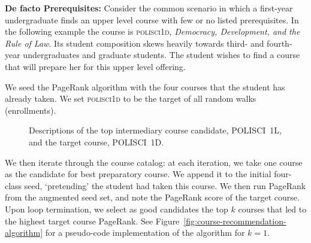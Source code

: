 {\bf De facto Prerequisites:} Consider the common scenario in
which a first-year undergraduate finds an upper
level course with few or no listed prerequisites. In the following
example the course is \textsc{polisci1d}, {\em Democracy, Development, and
  the Rule of Law}. Its student composition skews heavily towards
third- and fourth- year undergraduates and graduate students. The
student wishes to find a course that will prepare her for this upper
level offering.

We seed the PageRank algorithm with the four courses that the student
has already taken. We set \textsc{polisci1d} to be the target of all random
walks (enrollments).

\begin{figure}
    \centering
    \noindent{}
    \noindent{}
    \caption{Descriptions of the top intermediary course candidate,
      POLISCI~1L, and the target course, POLISCI~1D.}
    \label{fig:pr-course-descriptions}
\end{figure}

We then iterate through the course catalog: at each iteration, we take
one course as the candidate for best preparatory course. We append it
to the initial four-class seed, `pretending' the student had taken
this course. We then run PageRank from the augmented seed set, and
note the PageRank score of the target course. Upon loop termination,
we select as good candidates the top $k$ courses that led to the
highest target course PageRank.  See
Figure~\ref{fig:course-recommendation-algorithm} for a pseudo-code
implementation of the algorithm for $k=1$.


